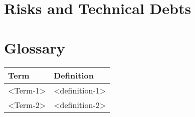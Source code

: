 




\section{Risks and Technical Debts}\label{section-technical-risks}

\section{Glossary}\label{section-glossary}

\begin{longtable}[]{@{}ll@{}}
\toprule
\begin{minipage}[b]{0.47\columnwidth}\raggedright\strut
Term\strut
\end{minipage} & \begin{minipage}[b]{0.47\columnwidth}\raggedright\strut
Definition\strut
\end{minipage}\tabularnewline
\midrule
\endhead
\begin{minipage}[t]{0.47\columnwidth}\raggedright\strut
\textless{}Term-1\textgreater{}\strut
\end{minipage} & \begin{minipage}[t]{0.47\columnwidth}\raggedright\strut
\textless{}definition-1\textgreater{}\strut
\end{minipage}\tabularnewline
\begin{minipage}[t]{0.47\columnwidth}\raggedright\strut
\textless{}Term-2\textgreater{}\strut
\end{minipage} & \begin{minipage}[t]{0.47\columnwidth}\raggedright\strut
\textless{}definition-2\textgreater{}\strut
\end{minipage}\tabularnewline
\bottomrule
\end{longtable}
